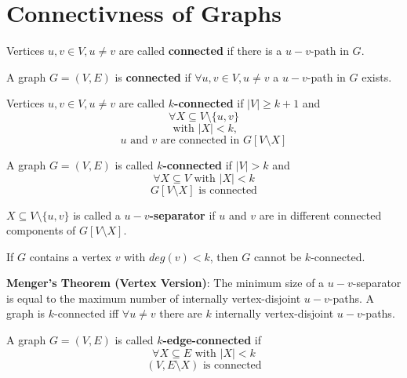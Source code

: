 \section{Connectivness of Graphs}

\begin{definition}
	Vertices $u, v \in V, u \neq v$ are called \textbf{connected} if there is a $u-v$-path in $G$.
\end{definition}

\begin{definition}
	A graph $G = (V, E)$ is \textbf{connected} if $\forall u, v \in V, u \neq v$ a $u-v$-path in $G$ exists.
\end{definition}

\begin{definition}
	Vertices $u, v \in V, u \neq v$ are called \textbf{$k$-connected} if $|V|\ge k+1$ and
	$$\forall X \subseteq V \setminus \{u, v\}$$
	$$ \text{ with } |X| \lt k,$$
	$$ u \text{ and } v \text{ are connected in } G[V \setminus X]$$
\end{definition}

\begin{definition}
	A graph $G = (V, E)$ is called \textbf{$k$-connected} if $|V| \gt k$ and
	$$\forall X \subseteq V \text{ with } |X| \lt k$$
	$$ G[V \setminus X] \text{ is connected}$$
\end{definition}

\begin{definition}
	$X \subseteq V \setminus \{u, v\}$ is called a \textbf{$u-v$-separator} if $u$ and $v$ are in different connected components of $G[V \setminus X]$.
\end{definition}

\begin{remark}
	If $G$ contains a vertex $v$ with $deg(v) < k$, then $G$ cannot be $k$-connected.
\end{remark}

\begin{theorem}
	\textbf{Menger's Theorem (Vertex Version)}: The minimum size of a $u-v$-separator is equal to the maximum number of internally vertex-disjoint $u-v$-paths. A graph is $k$-connected iff $\forall u \neq v$ there are $k$ internally vertex-disjoint $u-v$-paths.
\end{theorem}

\begin{definition}
	A graph $G = (V, E)$ is called \textbf{$k$-edge-connected} if
	$$\forall X \subseteq E \text{ with } |X| \lt k$$
	$$(V, E \setminus X) \text{ is connected}$$
\end{definition}


